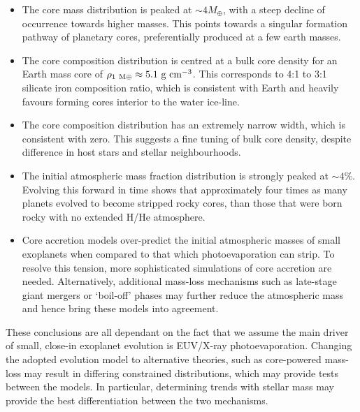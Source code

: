 \documentclass[fleqn,usenatbib]{mnras}
\begin{document}
\begin{itemize}
    \setlength\itemsep{1em}
    
    \item The core mass distribution is peaked at $\sim 4M_\oplus$, with a steep decline of occurrence towards higher masses. This points towards a singular formation pathway of planetary cores, preferentially produced at a few earth masses.
    
    \item The core composition distribution is centred at a bulk core density for an Earth mass core of $\rho_{1~{\rm M}\oplus} \approx 5.1 \text{ g cm}^{-3}$. This corresponds to 4:1 to 3:1 silicate iron composition ratio, which is consistent with Earth and heavily favours forming cores interior to the water ice-line.
    
    \item The core composition distribution has an extremely narrow width, which is consistent with zero. This suggests a fine tuning of bulk core density, despite difference in host stars and stellar neighbourhoods.
    
    \item The initial atmospheric mass fraction distribution is strongly peaked at $\sim 4\%$. Evolving this forward in time shows that approximately four times as many planets evolved to become stripped rocky cores, than those that were born rocky with no extended H/He atmosphere.
    
    \item Core accretion models over-predict the initial atmospheric masses of small exoplanets when compared to that which photoevaporation can strip. To resolve this tension, more sophisticated simulations of core accretion are needed. Alternatively, additional mass-loss mechanisms such as late-stage giant mergers or `boil-off' phases may further reduce the atmospheric mass and hence bring these models into agreement.
    
\end{itemize}

These conclusions are all dependant on the fact that we assume the main driver of small, close-in exoplanet evolution is EUV/X-ray photoevaporation. Changing the adopted evolution model to alternative theories, such as core-powered mass-loss may result in differing constrained distributions, which may provide tests between the models. In particular, determining trends with stellar mass may provide the best differentiation between the two mechanisms.
\end{document}
